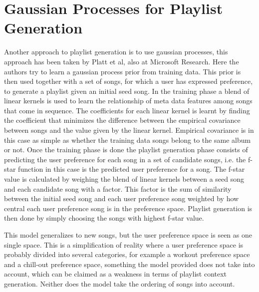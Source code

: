 \documentclass[a4paper,11pt]{kth-mag}
\begin{document}
\section{Gaussian Processes for Playlist Generation}
Another approach to playlist generation is to use gaussian processes, this approach has been taken by Platt et al, also at Microsoft Research. Here the authors try to learn a gaussian process prior from training data. This prior is then used together with a set of songs, for which a user has expressed preference, to generate a playlist given an initial seed song. In the training phase a blend of linear kernels is used to learn the relationship of meta data features among songs that come in sequence. The coefficients for each linear kernel is learnt by finding the coefficient that minimizes the difference between the empirical covariance between songs and the value given by the linear kernel. Empirical covariance is in this case as simple as whether the training data songs belong to the same album or not. Once the training phase is done the playlist generation phase consists of predicting the user preference for each song in a set of candidate songs, i.e. the f-star function in this case is the predicted user preference for a song. The f-star value is calculated by weighing the blend of linear kernels between a seed song and each candidate song with a factor. This factor is the sum of similarity between the initial seed song and each user preference song weighted by how central each user preference song is in the preference space. Playlist generation is then done by simply choosing the songs with highest f-star value\cite{platt2001learning}.

This model generalizes to new songs, but the user preference space is seen as one single space. This is a simplification of reality where a user preference space is probably divided into several categories, for example a workout preference space and a chill-out preference space, something the model provided does not take into account, which can be claimed as a weakness in terms of playlist context generation. Neither does the model take the ordering of songs into account.
\end{document}
